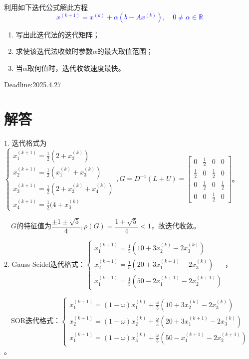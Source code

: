 \documentclass[cn,hazy,green,11pt,normal]{elegantnote}
\begin{document}
\begin{enumerate}
            利用如下迭代公式解此方程\textcolor{blue}{\[x^{(k+1)}=x^{(k)}+\alpha (b-Ax^{(k)}),\quad 0 \neq\alpha\in\mathbb{R}\]}
            \begin{enumerate}
                \item 写出此迭代法的迭代矩阵；
                \item 求使该迭代法收敛时参数$\alpha$的最大取值范围；
                \item 当$\alpha$取何值时，迭代收敛速度最快。
            \end{enumerate}

    \end{enumerate}

    Deadline:2025.4.27

\section{解答}

    $1.\,\,$迭代格式为$\begin{cases}x_1^{(k+1)}=\frac12(2+x_2^{(k)})\\x_2^{(k+1)}=\frac12(x_1^{(k)}+x_3^{(k)})\\x_3^{(k+1)}=\frac12(2+x_2^{(k)}+x_4^{(k)})\\x_4^{(k+1)}=\frac12(4+x_3^{(k)}\end{cases},G=D^{-1}(L+U)=\begin{bmatrix}0&\frac12&0&0\\\frac12&0 &\frac12&0 \\0&\frac12&0&\frac12\\0&0&\frac12& 0\end{bmatrix}$。

    $\quad G$的特征值为$\dfrac{\pm 1\pm\sqrt{5}}{4},\rho(G)=\dfrac{1+\sqrt{5}}4<1$，故迭代收敛。

    $2.\,\,$Gauss-Seidel迭代格式：$\begin{cases}x_1^{(k+1)}=\frac15(10+3x_2^{(k)}-2x_3^{(k)})\\x_2^{(k+1)}=\frac15(20+3x_1^{(k+1)}-2x_3^{(k)})\\x_1^{(k+1)}=\frac15(50-2x_1^{(k+1)}-2x_2^{(k+1)})\end{cases}$，

    $\quad $SOR迭代格式：$\begin{cases}x_1^{(k+1)}=(1-\omega)x_1^{(k)}+\frac{\omega}5(10+3x_2^{(k)}-2x_3^{(k)})\\x_2^{(k+1)}=(1-\omega)x_2^{(k)}+\frac{\omega}5(20+3x_1^{(k+1)}-2x_3^{(k)})\\x_1^{(k+1)}=(1-\omega)x_3^{(k)}+\frac{\omega}5(50-x_1^{(k+1)}-2x_2^{(k+1)})\end{cases}$。
\end{document}
